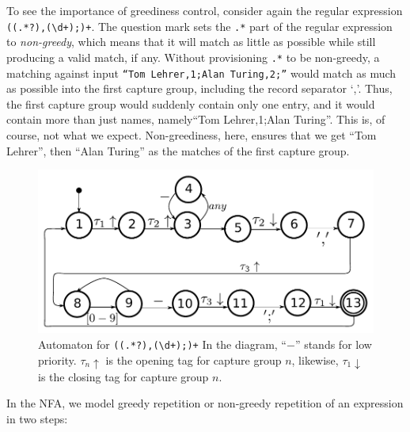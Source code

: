 \documentclass[english]{sigplanconf}
\theoremstyle{definition}
\begin{document}
To see the importance of greediness control, consider again the regular
expression \texttt{((.*?),(\textbackslash{}d+);)+}. The question
mark sets the \texttt{.*} part of the regular expression to
\emph{non-greedy}, which means that it will match as little as
possible while still producing a valid match, if any.  Without
provisioning \texttt{.*} to be non-greedy, a matching against input
\texttt{``Tom Lehrer,1;Alan Turing,2;''} would match as much as
possible into the first capture group, including the record separator
`,'.  Thus, the first capture group would suddenly contain only one
entry, and it would contain more than just names, namely``Tom
Lehrer,1;Alan Turing''.  This is, of course, not what we expect.
Non-greediness, here, ensures that we get ``Tom Lehrer'', then
``Alan Turing'' as the matches of the first capture group.

\begin{figure}[htp]
\includegraphics[width=\linewidth]{graphs/lehrer_automaton}

\caption{\label{fig:example-automaton}
Automaton for \texttt{((.*?),(\textbackslash{}d+);)+} 
In the diagram, ``$-$'' stands for low priority. $\tau_n\uparrow$ is the opening tag for capture group $n$, likewise, $\tau_1\downarrow$ is the closing tag for capture group $n$.}
\end{figure}


In the NFA, we model greedy repetition or non-greedy repetition of
an expression in two steps:
\end{document}
